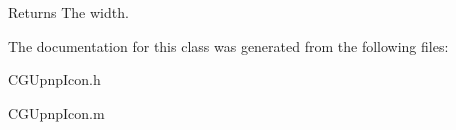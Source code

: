 \begin{DoxyReturn}{Returns}
The width. 
\end{DoxyReturn}


The documentation for this class was generated from the following files\-:\begin{DoxyCompactItemize}
\item 
C\-G\-Upnp\-Icon.\-h\item 
C\-G\-Upnp\-Icon.\-m\end{DoxyCompactItemize}
